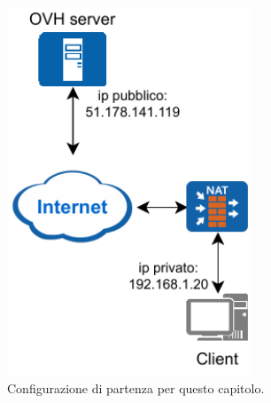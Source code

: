 \newsavebox{\myimage}
\begin{figure}[H]
    \centering%
    \begin{subfigure}{0.49\textwidth}
        \centering
        \includegraphics[width=0.8\textwidth]{immagini/diag-simple_ips}
        \caption{Configurazione di partenza per questo capitolo.\newline}
        \label{fig:diag-simple_ips}
    \end{subfigure}
    \hfill%
    \begin{subfigure}{0.49\textwidth}
        \centering

\end{subfigure}
\end{figure}
